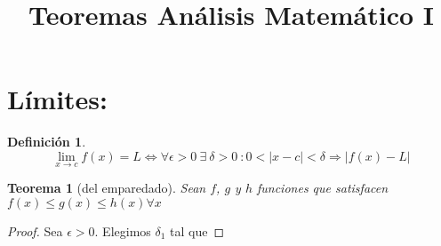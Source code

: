 \documentclass{article}
\title{Teoremas Análisis Matemático I}
\date{}
\author{}
\newtheorem*{theorem}{Teorema}
\newtheorem*{definition}{Definición}
\begin{document}
  \maketitle
  \section*{Límites:} 
    \begin{definition}
     \[
        \lim_{x\to c}f(x)=L\iff\forall\epsilon>0 \ \exists\ \delta>0\ :0<|x-c|<\delta\Longrightarrow|f(x)-L| 
      \]
    \end{definition}
    \begin{theorem}[del emparedado]
        Sean $f$, $g$ y $h$ funciones que satisfacen $f(x)\leqslant g(x)\leqslant h(x)\forall x$ 
      \end{theorem}
      \begin{proof}
        Sea $\epsilon>0$. Elegimos $\delta_1$ tal que
      \end{proof}
\end{document}
